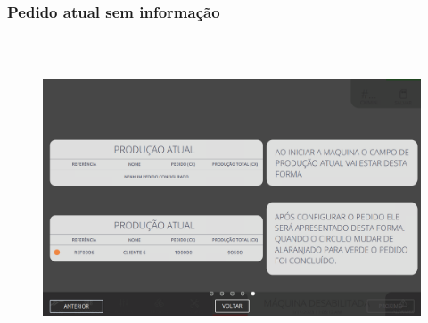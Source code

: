 \vspace*{\fill}
\newpage
\thispagestyle{fancy}

\vspace*{\fill}

\subsubsection{\small{Pedido atual sem informação}}

\begin{figure}[h]
  \centering
  \includegraphics[width=576px,height=360px]{src/imagesFlexo/01-main/e-5.png}
   \label{}
\end{figure}

\vspace*{\fill}